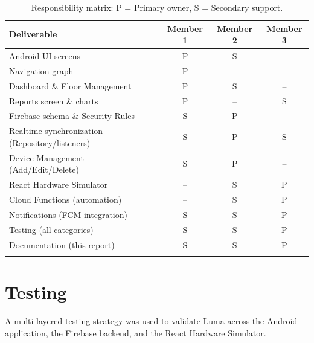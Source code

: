 \documentclass[11pt,a4paper]{article}
\begin{document}
\begin{longtable}{@{}p{5.4cm}ccc@{}}
\toprule
\textbf{Deliverable} & \textbf{Member 1} & \textbf{Member 2} & \textbf{Member 3} \\
\midrule
\endhead
Android UI screens & P & S & -- \\
Navigation graph & P & -- & -- \\
Dashboard \& Floor Management & P & S & -- \\
Reports screen \& charts & P & -- & S \\
Firebase schema \& Security Rules & S & P & -- \\
Realtime synchronization (Repository/listeners) & S & P & S \\
Device Management (Add/Edit/Delete) & S & P & -- \\
React Hardware Simulator & -- & S & P \\
Cloud Functions (automation) & -- & S & P \\
Notifications (FCM integration) & S & S & P \\
Testing (all categories) & S & S & P \\
Documentation (this report) & S & S & P \\
\bottomrule
\caption{Responsibility matrix: P = Primary owner, S = Secondary support.}
\label{tab:responsibility-matrix}
\end{longtable}

\section{Testing}
\label{sec:testing}

A multi-layered testing strategy was used to validate Luma across the Android application, the Firebase backend, and the React Hardware Simulator.
\end{document}
